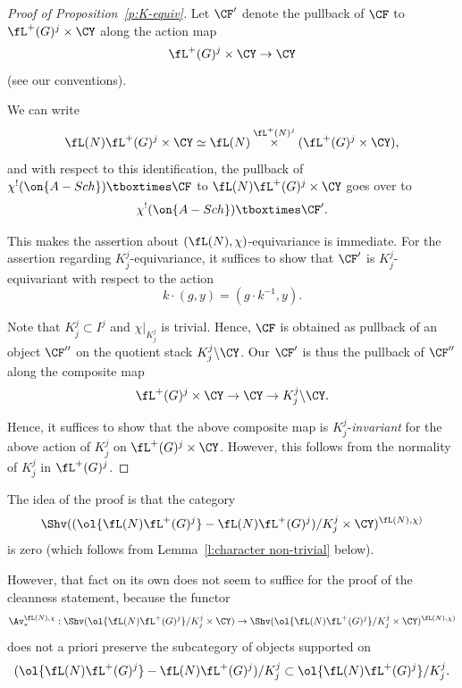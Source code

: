 \documentclass[9pt]{amsart}
\theoremstyle{definition}
\theoremstyle{remark}
\newcommand{\lemref}[1]{Lemma~\ref{#1}}
\newcommand{\propref}[1]{Proposition~\ref{#1}}
\numberwithin{equation}{section}
\begin{document}
\begin{proof}[Proof of \propref{p:K-equiv}]

Let $\CF'$ denote the pullback of $\CF$ to $\fL^+(G)^j\times \CY$ along the action map
$$\fL^+(G)^j\times \CY\to \CY$$
(see our conventions). 

\medskip

We can write
$$\fL(N)\fL^+(G)^j\times \CY\simeq  \fL(N) \overset{\fL^+(N)^j}\times (\fL^+(G)^j\times \CY),$$
and with respect to this identification, the pullback of $\chi^!(\on{A-Sch})\tboxtimes \CF$ to $\fL(N)\fL^+(G)^j\times \CY$
goes over to
$$\chi^!(\on{A-Sch})\tboxtimes \CF'.$$

\medskip

This makes the assertion about $(\fL(N),\chi)$-equivariance is immediate. For the assertion regarding $K^j_j$-equivariance, 
it suffices to show that $\CF'$ is $K^j_j$-equivariant with respect to the action
$$k\cdot (g,y)=(g\cdot k^{-1},y).$$

\medskip

Note that $K^j_j\subset I^j$ and $\chi|_{K^j_j}$ is trivial. Hence, $\CF$ is obtained as pullback of an object $\CF''$ on the quotient stack
$K^j_j\backslash \CY$. Our $\CF'$ is thus the pullback of $\CF''$ along the composite map 
$$\fL^+(G)^j\times \CY\to \CY\to K^j_j\backslash \CY.$$

Hence, it suffices to show that the above composite map is $K^j_j$-\emph{invariant} for the above action of $K^j_j$ on $\fL^+(G)^j\times \CY$.
However, this follows from the normality of $K^j_j$ in $\fL^+(G)^j$.

\end{proof}


\ssec{Proof of \propref{p:pure clean}}

\sssec{}

The idea of the proof is that the category 
$$\Shv((\ol{\fL(N)\fL^+(G)^j}-\fL(N)\fL^+(G)^j)/K^j_j\times \CY)^{\fL(N),\chi)}$$
is zero (which follows from \lemref{l:character non-trivial} below). 

\medskip

However, that fact on its own does not seem to suffice for the proof
of the cleanness statement, because the functor 
$$\Av_*^{\fL(N),\chi}:\Shv(\ol{\fL(N)\fL^+(G)^j}/K^j_j\times \CY)\to
\Shv(\ol{\fL(N)\fL^+(G)^j}/K^j_j\times \CY)^{\fL(N),\chi)}$$
does not a priori preserve the subcategory of objects supported on
$$(\ol{\fL(N)\fL^+(G)^j}-\fL(N)\fL^+(G)^j)/K^j_j\subset \ol{\fL(N)\fL^+(G)^j}/K^j_j.$$
\end{document}
